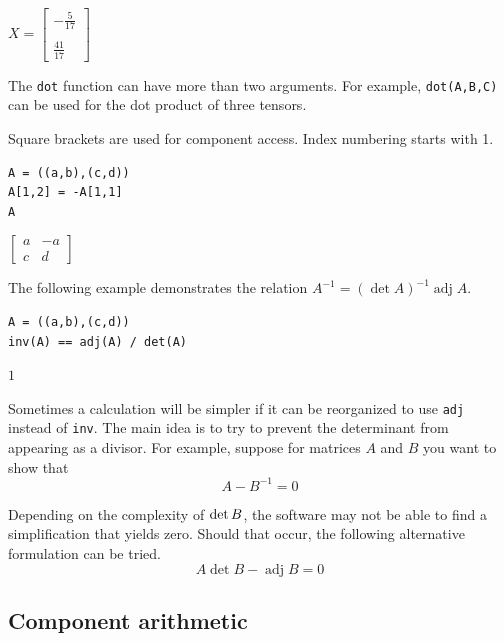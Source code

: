 \documentclass[12pt]{article}
\begin{document}
$\displaystyle
X=
\begin{bmatrix}
-\tfrac{5}{17}
\\
\\
\tfrac{41}{17}
\end{bmatrix}
$

\bigskip

The \verb$dot$ function can have more than two arguments.
For example, \verb$dot(A,B,C)$ can be used for the dot product of three tensors.

\bigskip

Square brackets are used for component access.
Index numbering starts with 1.

{\color{blue}
\begin{verbatim}
A = ((a,b),(c,d))
A[1,2] = -A[1,1]
A
\end{verbatim}
}

$\displaystyle
\begin{bmatrix}
a & -a
\\[1ex]
c & d
\end{bmatrix}
$

\bigskip

The following example demonstrates the relation
$A^{-1}=(\operatorname{det}A)^{-1}\operatorname{adj}A$.

{\color{blue}
\begin{verbatim}
A = ((a,b),(c,d))
inv(A) == adj(A) / det(A)
\end{verbatim}
}

$\displaystyle 1$

\bigskip

Sometimes a calculation will be simpler if it can be reorganized to use
\verb$adj$ instead of \verb$inv$.
The main idea is to try to prevent the determinant from appearing as a
divisor.
For example, suppose for matrices $A$ and $B$ you want to show that
\begin{equation*}
{A}-{B}^{-1}=0
\end{equation*}

Depending on the complexity of $\mathop{\rm det}B$, the software
may not be able to find a simplification that yields zero.
Should that occur, the following alternative formulation can be tried.
\begin{equation*}
A\operatorname{det}B-\operatorname{adj}B=0
\end{equation*}

\subsection{Component arithmetic}
\end{document}
